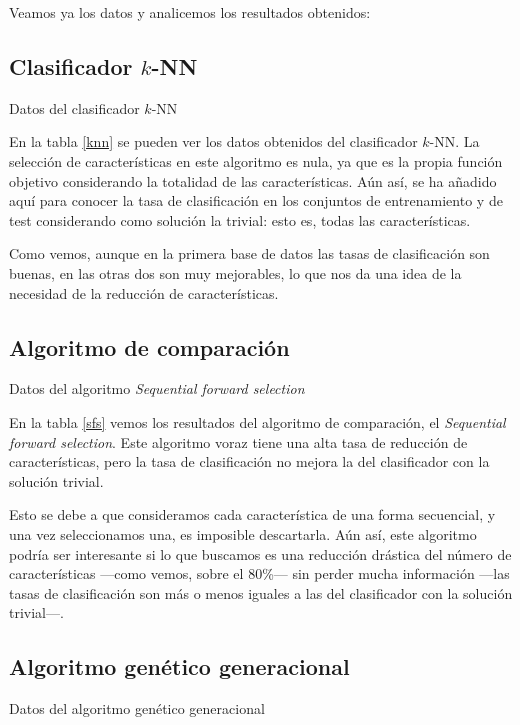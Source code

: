 \documentclass[a4paper, 11pt, titlepage]{article}
\begin{document}
    Veamos ya los datos y analicemos los resultados obtenidos:

    \subsection{Clasificador $k$-NN}
    \begin{table}[!htb]
        \maketable{\dataKNN}
        \caption{Datos del clasificador $k$-NN}
        \label{knn}
    \end{table}

    En la tabla \ref{knn} se pueden ver los datos obtenidos del clasificador $k$-NN. La selección de características en este algoritmo es nula, ya que es la propia función objetivo considerando la totalidad de las características. Aún así, se ha añadido aquí para conocer la tasa de clasificación en los conjuntos de entrenamiento y de test considerando como solución la trivial: esto es, todas las características.

    Como vemos, aunque en la primera base de datos las tasas de clasificación son buenas, en las otras dos son muy mejorables, lo que nos da una idea de la necesidad de la reducción de características.

    \subsection{Algoritmo de comparación}
    \begin{table}[!htb]
        \maketable{\dataSFS}
        \caption{Datos del algoritmo \emph{Sequential forward selection}}
        \label{sfs}
    \end{table}

    En la tabla \ref{sfs} vemos los resultados del algoritmo de comparación, el \emph{Sequential forward selection}. Este algoritmo voraz tiene una alta tasa de reducción de características, pero la tasa de clasificación no mejora la del clasificador con la solución trivial.

    Esto se debe a que consideramos cada característica de una forma secuencial, y una vez seleccionamos una, es imposible descartarla. Aún así, este algoritmo podría ser interesante si lo que buscamos es una reducción drástica del número de características ---como vemos, sobre el 80\%--- sin perder mucha información ---las tasas de clasificación son más o menos iguales a las del clasificador con la solución trivial---.

    \subsection{Algoritmo genético generacional}
    \begin{table}[!htb]
        \maketable{\dataAGG}
        \caption{Datos del algoritmo genético generacional}
        \label{tablaAGG}
    \end{table}
\end{document}
